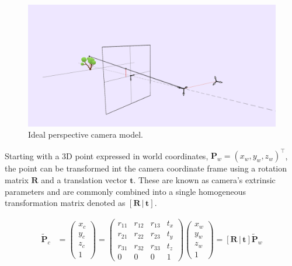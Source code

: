 \begin{figure}[h!]
    \centering
    \includegraphics[width=\linewidth]{images/metodology/pinhole_model2.png}
    \caption{Ideal perspective camera model.}
    \label{fig:pinhole_model}
\end{figure}

Starting with a 3D point expressed in world coordinates, $\mathbf{P}_w = \left(x_w, y_w, z_w\right)^\top$, the point can be transformed int the camera coordinate frame using a rotation matrix $\mathbf{R}$ and a translation vector $\mathbf{t}$. These are known as camera's extrinsic parameters and are commonly combined into a single homogeneous transformation matrix denoted as $\left[\mathbf{R} \,|\, \mathbf{t}\right]$.

\begin{align}
    \tilde{\mathbf{P}}_c 
    &=
    \begin{pmatrix}
        x_c \\
        y_c \\
        z_c \\
        1
    \end{pmatrix}
    =
    \begin{pmatrix}
        r_{11} & r_{12} & r_{13} & t_x \\
        r_{21} & r_{22} & r_{23} & t_y \\
        r_{31} & r_{32} & r_{33} & t_z \\
        0 & 0 & 0 & 1
    \end{pmatrix}
    \begin{pmatrix}
        x_w \\
        y_w \\
        z_w \\
        1
    \end{pmatrix}
    =
    \left[ \mathbf{R} \,|\, \mathbf{t} \right] \tilde{\mathbf{P}}_w 
\end{align}

